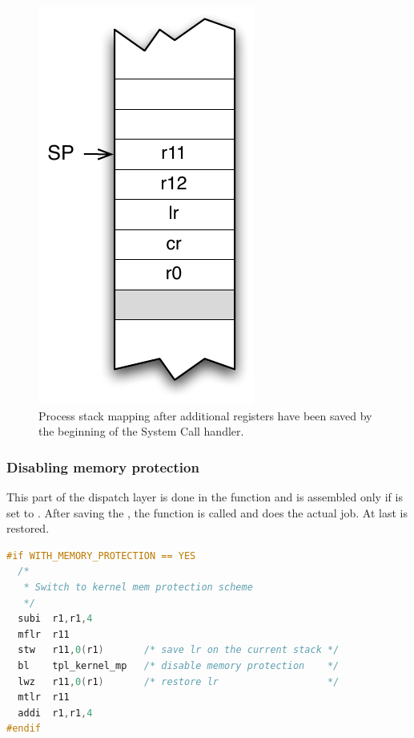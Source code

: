 \begin{figure}[htbp] %
\begin{minipage}{0.5\textwidth}
    \centering
  \includegraphics[scale=.6]{pictures/PStackAfterSCSaving} 
\end{minipage}
\begin{minipage}{0.5\textwidth}
   \caption{Process stack mapping after additional registers have been saved by the beginning of the System Call handler.}\label{fig:stackSavingSC}
\end{minipage}
\end{figure}

\subsubsection{Disabling memory protection}

This part of the dispatch layer is done in the  function and is assembled only if  is set to \YES. After saving the , the  function is called and does the actual job. At last  is restored.

\begin{lstlisting}[language=C]
#if WITH_MEMORY_PROTECTION == YES
  /*
   * Switch to kernel mem protection scheme
   */
  subi  r1,r1,4
  mflr  r11
  stw   r11,0(r1)       /* save lr on the current stack */
  bl    tpl_kernel_mp   /* disable memory protection    */
  lwz   r11,0(r1)       /* restore lr                   */
  mtlr  r11
  addi  r1,r1,4
#endif
\end{lstlisting}

